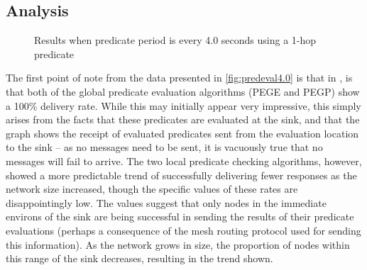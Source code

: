 \subsection{Analysis}

\begin{figure}[H]
\centering
{}

\caption{Results when predicate period is every 4.0 seconds using a 1-hop predicate}
\label{fig:predeval4.0}
\end{figure}

The first point of note from the data presented in \autoref{fig:predeval4.0} is that in , is that both of the global predicate evaluation algorithms (PEGE and PEGP) show a 100\% delivery rate. While this may initially appear very impressive, this simply arises from the facts that these predicates are evaluated at the sink, and that the graph shows the receipt of evaluated predicates sent from the evaluation location to the sink -- as no messages need to be sent, it is vacuously true that no messages will fail to arrive. The two local predicate checking algorithms, however, showed a more predictable trend of successfully delivering fewer responses as the network size increased, though the specific values of these rates are disappointingly low. The values suggest that only nodes in the immediate environs of the sink are being successful in sending the results of their predicate evaluations (perhaps a consequence of the mesh routing protocol used for sending this information). As the network grows in size, the proportion of nodes within this range of the sink decreases, resulting in the trend shown.

